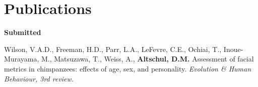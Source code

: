 \documentclass[margin,line]{res}
\newenvironment{list1}{
  \begin{list}{\ding{113}}{%
      \setlength{\itemsep}{0in}
      \setlength{\parsep}{0in} \setlength{\parskip}{0in}
      \setlength{\topsep}{0in} \setlength{\partopsep}{0in} 
      \setlength{\leftmargin}{0.17in}}}{\end{list}}
\begin{document}
\begin{resume}
\begin{list1}
\end{list1}

\vspace{0.7cm}



%
%
% 
%
%



\section{\sc Publications} 

%
%
%
%
%
%
%
%

{\bf Submitted}

Wilson, V.A.D., Freeman, H.D., Parr, L.A., LeFevre, C.E., Ochiai, T., Inoue-Murayama, M., Matsuzawa, T., Weiss, A., {\bf Altschul, D.M.} Assessment of facial metrics in chimpanzees: effects of age, sex, and personality. {\it Evolution \& Human Behaviour, 3rd review.}


\end{resume}
\end{document}
